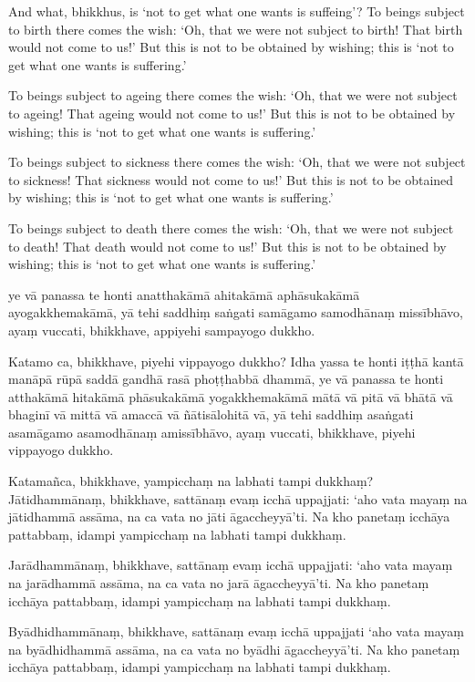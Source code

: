 And what, bhikkhus, is `not to get what one wants is suffeing'? To beings
subject to birth there comes the wish: `Oh, that we were not subject to birth!
That birth would not come to us!' But this is not to be obtained by wishing;
this is `not to get what one wants is suffering.'

To beings subject to ageing there comes the wish: `Oh, that we were not subject
to ageing! That ageing would not come to us!' But this is not to be obtained by
wishing; this is `not to get what one wants is suffering.'

To beings subject to sickness there comes the wish: `Oh, that we were not
subject to sickness! That sickness would not come to us!' But this is not to be
obtained by wishing; this is `not to get what one wants is suffering.'

To beings subject to death there comes the wish: `Oh, that we were not subject
to death! That death would not come to us!' But this is not to be obtained by
wishing; this is `not to get what one wants is suffering.'

\paliPage

ye vā panassa te honti anatthakāmā ahitakāmā aphāsukakāmā ayogakkhemakāmā, yā
tehi saddhiṃ saṅgati samāgamo samodhānaṃ missībhāvo, ayaṃ vuccati, bhikkhave,
appiyehi sampayogo dukkho.

Katamo ca, bhikkhave, piyehi vippayogo dukkho? Idha yassa te honti iṭṭhā kantā
manāpā rūpā saddā gandhā rasā phoṭṭhabbā dhammā, ye vā panassa te honti
atthakāmā hitakāmā phāsukakāmā yogakkhemakāmā mātā vā pitā vā bhātā vā bhaginī
vā mittā vā amaccā vā ñātisālohitā vā, yā tehi saddhiṃ asaṅgati asamāgamo
asamodhānaṃ amissībhāvo, ayaṃ vuccati, bhikkhave, piyehi vippayogo dukkho.

Katamañca, bhikkhave, yampicchaṃ na labhati tampi dukkhaṃ? Jātidhammānaṃ,
bhikkhave, sattānaṃ evaṃ icchā uppajjati: ‘aho vata mayaṃ na jātidhammā assāma,
na ca vata no jāti āgaccheyyā’ti. Na kho panetaṃ icchāya pattabbaṃ, idampi
yampicchaṃ na labhati tampi dukkhaṃ.

Jarādhammānaṃ, bhikkhave, sattānaṃ evaṃ icchā uppajjati: ‘aho vata mayaṃ na
jarādhammā assāma, na ca vata no jarā āgaccheyyā’ti. Na kho panetaṃ icchāya
pattabbaṃ, idampi yampicchaṃ na labhati tampi dukkhaṃ.

Byādhidhammānaṃ, bhikkhave, sattānaṃ evaṃ icchā uppajjati ‘aho vata mayaṃ na
byādhidhammā assāma, na ca vata no byādhi āgaccheyyā’ti. Na kho panetaṃ icchāya
pattabbaṃ, idampi yampicchaṃ na labhati tampi dukkhaṃ.

